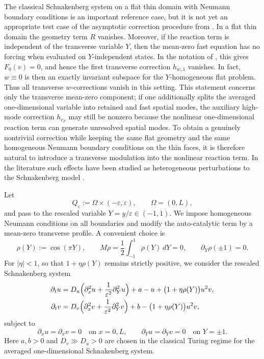 \documentclass[11pt]{article}
\theoremstyle{definition}
\theoremstyle{remark}
\numberwithin{equation}{section}
\begin{document}
The classical Schnakenberg system on a flat thin domain with Neumann boundary conditions is an important reference case, but it is not yet an appropriate test case of the asymptotic correction procedure from . 
In a flat thin domain the geometry term \(R\) vanishes. Moreover, if the
reaction term is independent of the transverse variable \(Y\), then the
mean-zero fast equation has no forcing when evaluated on \(Y\)-independent
states. In the notation of , this gives
\(F_0(v)=0\), and hence the first transverse correction \(h_{w,1}\) vanishes.
In fact, \(w\equiv0\) is then an exactly invariant subspace for the
\(Y\)-homogeneous flat problem. Thus all transverse \(w\)-corrections vanish
in this setting. This statement concerns only the transverse mean-zero
component; if one additionally splits the averaged one-dimensional variable
into retained and fast spatial modes, the auxiliary high-mode correction
\(h_{v_F}\) may still be nonzero because the nonlinear one-dimensional
reaction term can generate unresolved spatial modes.
To obtain a genuinely nontrivial correction while keeping the same flat geometry and the same homogeneous Neumann boundary conditions on the thin faces, it is therefore natural to introduce a transverse modulation into the nonlinear reaction term.
In the literature such effects have been studied as heterogeneous perturbations to the Schnakenberg model \cite{ishii2021effect,wong2021spot}.

Let
\[
Q_\varepsilon := \Omega \times (-\varepsilon,\varepsilon), \qquad \Omega=(0,L),
\]
and pass to the rescaled variable $Y=y/\varepsilon \in (-1,1)$. We impose homogeneous Neumann conditions on all boundaries and modify the auto-catalytic term by a mean-zero transverse profile. A convenient choice is
\[
\rho(Y):=\cos(\pi Y), \qquad M\rho = \frac12\int_{-1}^1 \rho(Y)\,dY = 0,
\qquad \partial_Y\rho(\pm 1)=0.
\]
For $|\eta|<1$, so that $1+\eta\rho(Y)$ remains strictly positive, we consider the rescaled Schnakenberg system
\begin{equation}\label{eq:schnakenberg rescaled}
\begin{aligned}
\partial_t u &= D_u\Bigl(\partial_x^2 u + \frac{1}{\varepsilon^2}\partial_Y^2 u\Bigr)
+ a-u + \bigl(1+\eta\rho(Y)\bigr)u^2v,
\\
\partial_t v &= D_v\Bigl(\partial_x^2 v + \frac{1}{\varepsilon^2}\partial_Y^2 v\Bigr)
+ b- \bigl(1+\eta\rho(Y)\bigr)u^2v,
\end{aligned}
\end{equation}
subject to
\[
\partial_x u = \partial_x v =0 \quad \text{on } x=0,L,
\qquad
\partial_Y u = \partial_Y v =0 \quad \text{on } Y=\pm 1.
\]
Here $a,b>0$ and $D_v \gg D_u>0$ are chosen in the classical Turing regime for the averaged one-dimensional Schnakenberg system.
\end{document}
